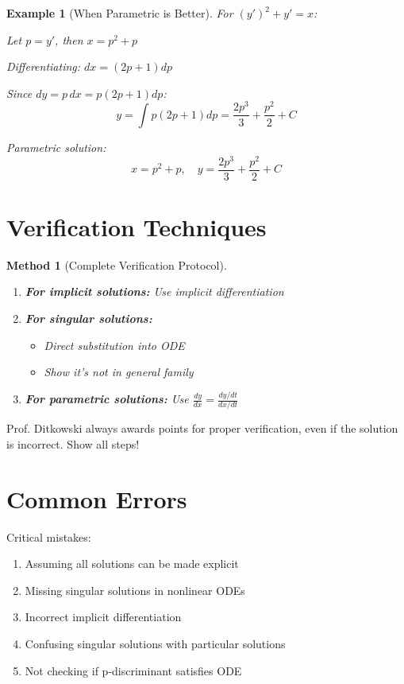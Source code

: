\documentclass[12pt]{article}
\newtheorem{method}{Method}
\newtheorem{example}{Example}
\begin{document}
\begin{example}[When Parametric is Better]
For $(y')^2 + y' = x$:

Let $p = y'$, then $x = p^2 + p$

Differentiating: $dx = (2p + 1)dp$

Since $dy = p\,dx = p(2p + 1)dp$:
$$y = \int p(2p + 1)dp = \frac{2p^3}{3} + \frac{p^2}{2} + C$$

Parametric solution:
$$x = p^2 + p, \quad y = \frac{2p^3}{3} + \frac{p^2}{2} + C$$
\end{example}

\section{Verification Techniques}

\begin{method}[Complete Verification Protocol]
\begin{enumerate}
    \item \textbf{For implicit solutions:} Use implicit differentiation
    \item \textbf{For singular solutions:}
        \begin{itemize}
            \item Direct substitution into ODE
            \item Show it's not in general family
        \end{itemize}
    \item \textbf{For parametric solutions:} Use $\frac{dy}{dx} = \frac{dy/dt}{dx/dt}$
\end{enumerate}
\end{method}

\begin{examtip}
Prof. Ditkowski always awards points for proper verification, even if the solution is incorrect. Show all steps!
\end{examtip}

\section{Common Errors}

\begin{warning}
Critical mistakes:
\begin{enumerate}
    \item Assuming all solutions can be made explicit
    \item Missing singular solutions in nonlinear ODEs
    \item Incorrect implicit differentiation
    \item Confusing singular solutions with particular solutions
    \item Not checking if p-discriminant satisfies ODE
\end{enumerate}
\end{warning}
\end{document}
